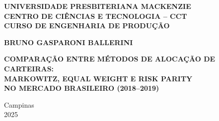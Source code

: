 
\begin{center}

\vspace*{2cm}

{\fontsize{12}{14.4}\selectfont\bfseries\MakeUppercase{UNIVERSIDADE PRESBITERIANA MACKENZIE}}\\
\vspace{0.5cm}
{\fontsize{12}{14.4}\selectfont\bfseries\MakeUppercase{Centro de Ciências e Tecnologia – CCT}}\\
\vspace{0.5cm}
{\fontsize{12}{14.4}\selectfont\bfseries\MakeUppercase{Curso de Engenharia de Produção}}\\

\vspace{4cm}

{\fontsize{12}{14.4}\selectfont\bfseries\MakeUppercase{BRUNO GASPARONI BALLERINI}}\\

\vspace{4cm}

{\fontsize{12}{14.4}\selectfont\bfseries\MakeUppercase{%
COMPARAÇÃO ENTRE MÉTODOS DE ALOCAÇÃO DE CARTEIRAS: \\
MARKOWITZ, EQUAL WEIGHT E RISK PARITY \\
NO MERCADO BRASILEIRO (2018–2019)%
}}\\

\vfill

{\fontsize{12}{14.4}\selectfont
Campinas\\
2025}

\end{center}